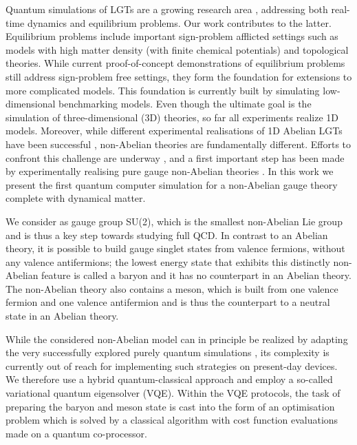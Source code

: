 \documentclass[twocolumn,aps,showpacs,prb,superscriptaddress,floatfix,10pt,nofootinbib]{revtex4-2}
\begin{document}
Quantum simulations of LGTs are a growing research area \cite{Banuls:2019bmf}, addressing both real-time dynamics and equilibrium problems. Our work contributes to the latter. Equilibrium problems include important sign-problem afflicted settings such as models with high matter density (with finite chemical potentials) and topological theories. 
While current proof-of-concept demonstrations of equilibrium problems still address sign-problem free settings, they form the foundation for extensions to more complicated models. This foundation is currently built by simulating low-dimensional benchmarking models. Even though the ultimate goal is the simulation of three-dimensional (3D) theories, so far all experiments realize 1D models. Moreover, while different experimental realisations of 1D Abelian LGTs have been successful \cite{martinez_real-time_2016,klco_quantum-classical_2018,kokail_self-verifying_2019,lu_simulations_2019,mil_scalable_2020,Yang2020Observation}, non-Abelian theories are fundamentally different. Efforts to confront this challenge are underway \cite{byrnes_simulating_2006,Zohar:2012xf,Banerjee:2012xg,tagliacozzo_simulation_2013,Stannigel:2013zka,zohar_quantum_2015,silvi_finite-density_2017,rico_so3_2018,bender_digital_2018,davoudi_search_2020,raychowdhury_loop_2020,kasper_non-abelian_2020,kasper_jaynescummings_2020}, and a first important step has been made by experimentally realising pure gauge non-Abelian theories \cite{klco_su2_2020,ciavarella_trailhead_2021}. In this work we present the first quantum computer simulation for a non-Abelian gauge theory complete with dynamical matter. 

We consider as gauge group SU(2), which is the smallest non-Abelian Lie group and is thus a key step towards studying full QCD. In contrast to an Abelian theory, it is possible to build gauge singlet states from valence fermions, without any valence antifermions; the lowest energy state that exhibits this distinctly non-Abelian feature is called a baryon and it has no counterpart in an Abelian theory. The non-Abelian theory also contains a meson, which is built from one valence fermion and one valence antifermion and is thus the counterpart to a neutral state in an Abelian theory. 

While the considered non-Abelian model can in principle be realized by adapting the very successfully explored purely quantum simulations \cite{martinez_real-time_2016, Gorg2019Realization, Schweizer2019Floquet, mil_scalable_2020, Yang2020Observation}, its complexity is currently out of reach for implementing such strategies on present-day devices. We therefore use a hybrid quantum-classical approach and employ a so-called variational quantum eigensolver (VQE). Within the VQE protocols, the task of preparing the baryon and meson state is cast into the form of an optimisation problem which is solved by a classical algorithm with cost function evaluations made on a quantum co-processor.
\end{document}
